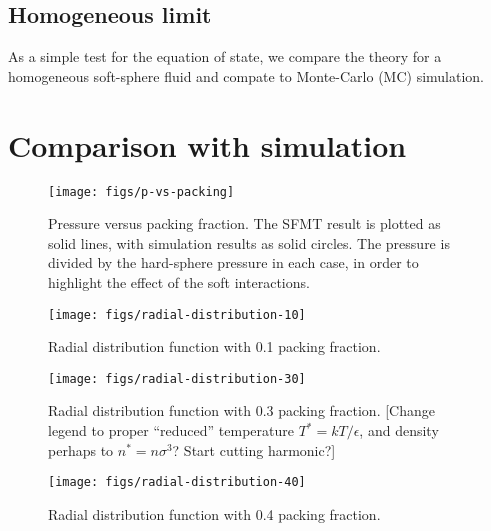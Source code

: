 \documentclass[letterpaper,twocolumn,amsmath,amssymb,prb]{revtex4-1}
\newcommand{\red}[1]{{\color{red} #1}}
\newcommand{\fixme}[1]{\red{[#1]}}
\begin{document}
\subsection{Homogeneous limit}

As a simple test for the equation of state, we compare the theory for
a homogeneous soft-sphere fluid and compate to Monte-Carlo (MC) simulation.
 
\section{Comparison with simulation}

\begin{figure}
\begin{center}
\texttt{[image: figs/p-vs-packing]}
\end{center}
\caption{Pressure versus packing fraction.  The SFMT result is plotted
  as solid lines, with simulation results as solid circles.  The
  pressure is divided by the hard-sphere pressure in each case, in
  order to highlight the effect of the soft interactions.}
\label{fig:p-vs-packing}
\end{figure}

\begin{figure}
\begin{center}
\texttt{[image: figs/radial-distribution-10]}
\end{center}
\caption{Radial distribution function with 0.1 packing
  fraction.}
\label{fig:radial-distribution-10}
\end{figure}

\begin{figure}
\begin{center}
\texttt{[image: figs/radial-distribution-30]}
\end{center}
\caption{Radial distribution function with 0.3 packing
  fraction.  \fixme{Change legend to proper ``reduced'' temperature
    $T^* = kT/\epsilon$, and density perhaps to $n^* = n\sigma^3$?
    Start cutting harmonic?}}
\label{fig:radial-distribution-30}
\end{figure}

\begin{figure}
\begin{center}
\texttt{[image: figs/radial-distribution-40]}
\end{center}
\caption{Radial distribution function with 0.4 packing
  fraction.}
\label{fig:radial-distribution-40}
\end{figure}
\end{document}
